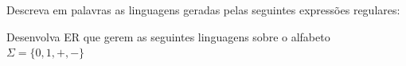 \documentclass[12pt]{exam}
\def\ve{\varepsilon}
\begin{document}
\begin{questions}



\question Descreva em palavras as linguagens geradas pelas seguintes expressões regulares:






\break





\question Desenvolva ER que gerem as seguintes linguagens sobre o alfabeto $\Sigma = \{0,1,+,-\}$


\end{questions}
\end{document}
